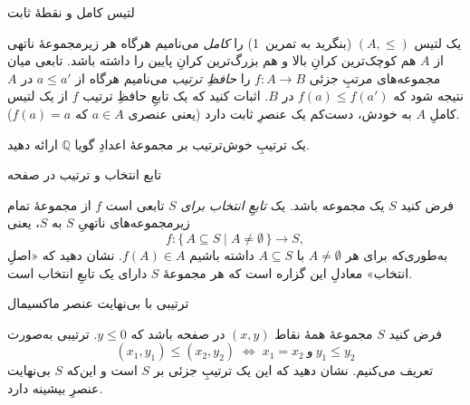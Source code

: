 \begin{frame}[t]{لتیس کامل و نقطهٔ ثابت}

    \begin{exercise}
        یک لتیس $(A,\le)$ (بنگرید به تمرین~1) را \textit{کامل} می‌نامیم هرگاه هر زیرمجموعهٔ ناتهی از $A$ هم کوچک‌ترین کرانِ بالا و هم بزرگ‌ترین کرانِ پایین را داشته باشد.
        تابعی میان مجموعه‌های مرتبِ جزئی $f\colon A \to B$ را \textit{حافظِ ترتیب} می‌نامیم هرگاه از $a \le a'$ در $A$ نتیجه شود که $f(a) \le f(a')$ در $B$.
        اثبات کنید که یک تابعِ حافظِ ترتیب $f$ از یک لتیس کاملِ $A$ به خودش، دست‌کم یک عنصرِ ثابت دارد (یعنی عنصری $a \in A$ که $f(a)=a$).

    \end{exercise}

    \begin{exercise}
        یک ترتیبِ خوش‌ترتیب بر مجموعهٔ اعدادِ گویا $\mathbb{Q}$ ارائه دهید.

    \end{exercise}
\end{frame}



\begin{frame}[t]{تابع انتخاب و ترتیب در صفحه}
    \begin{exercise}
        فرض کنید $S$ یک مجموعه باشد. یک \textit{تابعِ انتخاب برای $S$} تابعی است
        \( f \) از مجموعهٔ تمام زیرمجموعه‌های ناتهیِ $S$ به $S$، یعنی
        \[
            f:\{\,A \subseteq S \mid A \neq \emptyset\,\}\longrightarrow S,
        \]
        به‌طوری‌که برای هر \( A \neq \emptyset \) با \( A \subseteq S \) داشته باشیم \( f(A)\in A \).
        نشان دهید که «اصلِ انتخاب» معادلِ این گزاره است که هر مجموعهٔ \( S \) دارای یک تابعِ انتخاب است.

    \end{exercise}

\end{frame}

\begin{frame}[t]{ترتیبی با بی‌نهایت عنصر ماکسیمال}
    \begin{exercise}
        فرض کنید $S$ مجموعهٔ همهٔ نقاط $(x,y)$ در صفحه باشد که $y \le 0$. ترتیبی به‌صورت
        \[
            (x_1,y_1) \le (x_2,y_2) \;\Leftrightarrow\; x_1 = x_2 \ \text{و}\ y_1 \le y_2
        \]
        تعریف می‌کنیم. نشان دهید که این یک ترتیبِ جزئی بر $S$ است و این‌که $S$ بی‌نهایت عنصرِ بیشینه دارد.

    \end{exercise}


\end{frame}
